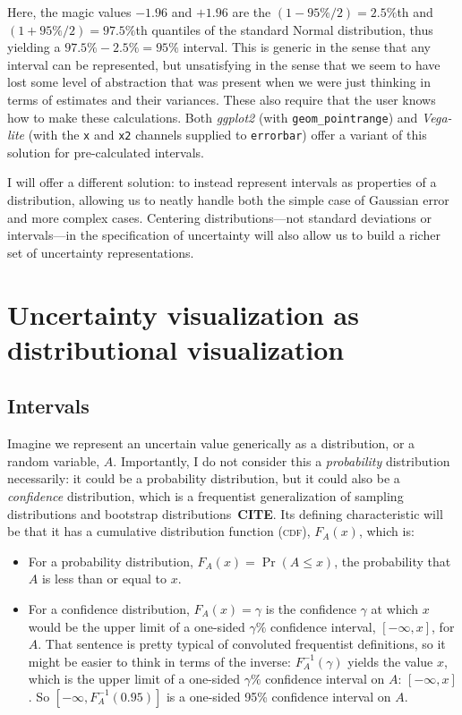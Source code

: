 \documentclass[journal]{vgtc}                     %
\begin{document}
Here, the magic values $-1.96$ and $+1.96$ are the $(1-95\%/2) = 2.5\%$th and $(1+95\%/2) = 97.5\%$th quantiles of the standard Normal distribution, thus yielding a $97.5\% - 2.5\% = 95\%$ interval. This is generic in the sense that any interval can be represented, but unsatisfying in the sense that we seem to have lost some level of abstraction that was present when we were just thinking in terms of estimates and their variances. These also require that the user knows how to make these calculations. Both \textit{ggplot2} (with \texttt{geom\_pointrange}) and \textit{Vega-lite} (with the \texttt{x} and \texttt{x2} channels supplied to \texttt{errorbar}) offer a variant of this solution for pre-calculated intervals. 

I will offer a different solution: to instead represent intervals as properties of a distribution, allowing us to neatly handle both the simple case of Gaussian error and more complex cases. Centering distributions---not standard deviations or intervals---in the specification of uncertainty will also allow us to build a richer set of uncertainty representations.

\section{Uncertainty visualization as distributional visualization}

\subsection{Intervals}

Imagine we represent an uncertain value generically as a distribution, or a random variable, $A$. Importantly, I do not consider this a \textit{probability} distribution necessarily: it could be a probability distribution, but it could also be a \textit{confidence} distribution, which is a frequentist generalization of sampling distributions and bootstrap distributions~\textbf{CITE}. Its defining characteristic will be that it has a cumulative distribution function (\textsc{cdf}), $F_A(x)$, which is:
\begin{itemize}
    \item For a probability distribution, $F_A(x) = \Pr(A \le x)$, the probability that $A$ is less than or equal to $x$.
    \item   For a confidence distribution, $F_A(x) = \gamma$  is the confidence $\gamma$ at which $x$ would be the upper limit of a one-sided $\gamma\%$ confidence interval, $[-\infty, x]$, for $A$. That sentence is pretty typical of convoluted frequentist definitions, so it might be easier to think in terms of the inverse: $F_A^{-1}(\gamma)$ yields the value $x$, which is the upper limit of a one-sided $\gamma\%$ confidence interval on $A$: $[-\infty,x]$. So $[-\infty, F_A^{-1}(0.95)]$ is a one-sided 95\% confidence interval on $A$.
\end{itemize}
\end{document}
